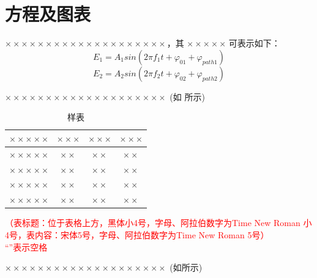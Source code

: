 \documentclass[a4paper]{article}
\begin{document}
\sectionbreak
\section{方程及图表}
\hspace{12em}

$ \times\times\times\times\times\times\times\times\times\times\times\times\times\times\times\times\times\times\times\times $，其 $ \times\times\times\times\times$ 可表示如下：
\begin{equation}
	E_{1}=A_{1}sin\!\left(2\pi f_{1}t+\varphi_{01}+\varphi_{path1} \right)
\end{equation}
\begin{equation}
	E_{2}=A_{2}sin\!\left(2\pi f_{2}t+\varphi_{02}+\varphi_{path2} \right)
\end{equation}

$ \times\times\times\times\times\times\times\times\times\times\times\times\times\times\times\times\times\times\times\times $  (如 所示)

\begin{table}[htpb]
	\centering
	\caption{样表}
	\label{table1}
	\song\wuhao\bfseries
	\begin{tabular}{cccc}
		\toprule
		$ \times\times\times\times\times $ & $ \times\times\times $ & $ \times\times\times $ & $ \times\times\times $ \\
		\hline
		$ \times\times\times\times\times $ & $ \times\times $       & $ \times\times $       & $ \times\times $       \\
		$ \times\times\times\times\times $ & $ \times\times $       & $ \times\times $       & $ \times\times $       \\
		$ \times\times\times\times\times $ & $ \times\times $       & $ \times\times $       & $ \times\times $       \\ 	    	\cline{2-4}
		$ \times\times\times\times\times $ & $ \times\times $       & $ \times\times $       & $ \times\times $       \\
		\bottomrule
	\end{tabular}
\end{table}
\textcolor{red}{（表标题：位于表格上方，黑体小4号，字母、阿拉伯数字为Time New Roman 小4号，表内容：宋体5号，字母、阿拉伯数字为Time New Roman 5号）\\ 
``\fbox{\phantom{a}}''表示空格}

$ \times\times\times\times\times\times\times\times\times\times\times\times\times\times\times\times\times\times\times\times $  (如所示)
\end{document}
